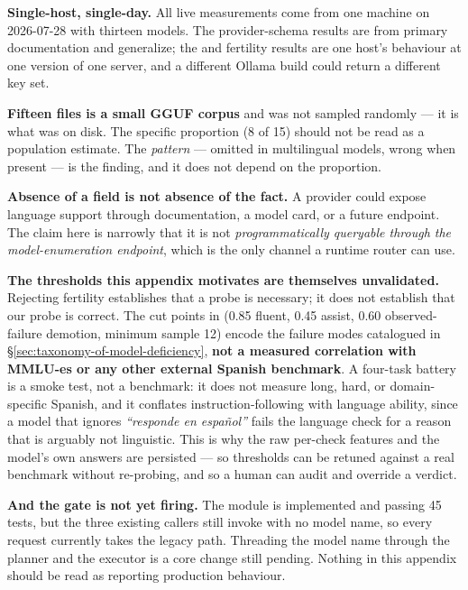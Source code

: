\textbf{Single-host, single-day.} All live measurements come from one machine on
2026-07-28 with thirteen models. The provider-schema results are from primary
documentation and generalize; the  and fertility results are one
host's behaviour at one version of one server, and a different Ollama build could
return a different key set.

\textbf{Fifteen files is a small GGUF corpus} and was not sampled randomly --- it
is what was on disk. The specific proportion (8 of 15) should not be read as a
population estimate. The \emph{pattern} --- omitted in multilingual models, wrong
when present --- is the finding, and it does not depend on the proportion.

\textbf{Absence of a field is not absence of the fact.} A provider could expose
language support through documentation, a model card, or a future endpoint. The
claim here is narrowly that it is not \emph{programmatically queryable through
the model-enumeration endpoint}, which is the only channel a runtime router can
use.

\textbf{The thresholds this appendix motivates are themselves unvalidated.}
Rejecting fertility establishes that a probe is necessary; it does not establish
that our probe is correct. The cut points in  (0.85 fluent,
0.45 assist, 0.60 observed-failure demotion, minimum sample 12) encode the
failure modes catalogued in \S\ref{sec:taxonomy-of-model-deficiency},
\textbf{not a measured correlation with MMLU-es or any other external Spanish
benchmark}. A four-task battery is a smoke test, not a benchmark: it does not
measure long, hard, or domain-specific Spanish, and it conflates
instruction-following with language ability, since a model that ignores
\foreignlanguage{spanish}{\emph{``responde en español''}} fails the language
check for a reason that is arguably not linguistic. This is why the raw
per-check features and the model's own answers are persisted --- so thresholds
can be retuned against a real benchmark without re-probing, and so a human can
audit and override a verdict.

\textbf{And the gate is not yet firing.} The module is implemented and passing 45
tests, but the three existing callers still invoke
 with no model name, so every request currently
takes the legacy path. Threading the model name through the planner and the
executor is a core change still pending. Nothing in this appendix should be read
as reporting production behaviour.

